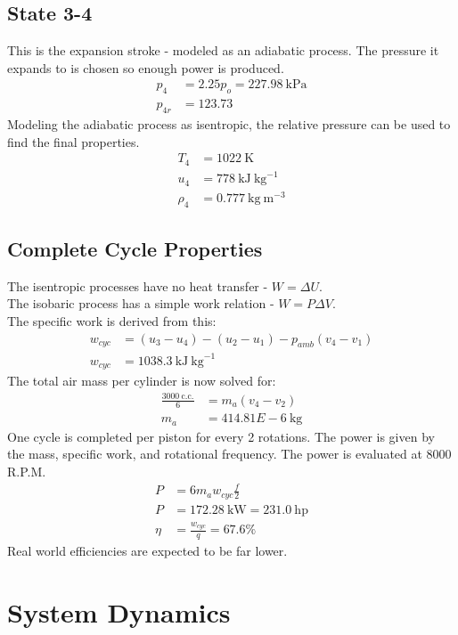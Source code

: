 \documentclass[10pt,a4paper]{article}
\begin{document}
	\subsection*{State 3-4}
	This is the expansion stroke - modeled as an adiabatic process. The pressure it expands to is chosen so enough power is produced.
	\begin{align*}
		p_4 &= 2.25 p_o = 227.98\ \text{kPa}\\
		p_{4r} &= 123.73
	\end{align*}
	Modeling the adiabatic process as isentropic, the relative pressure can be used to find the final properties.
	\begin{align*}
		T_4 &= 1022\ \text{K}\\
		u_4 &= 778\ \text{kJ}\ \text{kg}^{-1}\\
		\rho_4 &= 0.777\ \text{kg}\ \text{m}^{-3}
	\end{align*}
	\subsection*{Complete Cycle Properties}
	The isentropic processes have no heat transfer - $W = \Delta U$.\\
	The isobaric process has a simple work relation - $W = P \Delta V$.\\
	The specific work is derived from this:
	\begin{align*}
		w_{cyc} &= (u_3-u_4) - (u_2-u_1) - p_{amb}(v_4 - v_1) \\
		w_{cyc} &= 1038.3\ \text{kJ}\ \text{kg}^{-1}
	\end{align*}
	The total air mass per cylinder is now solved for:
	\begin{align*}
		\frac{3000\ \text{c.c.}}{6} &= m_a(v_4-v_2)\\
		m_a &= 414.81E-6\ \text{kg}
	\end{align*}
	One cycle is completed per piston for every 2 rotations. The power is given by the mass, specific work, and rotational frequency. The power is evaluated at 8000 R.P.M.
	\begin{align*}
		P &= 6 m_a w_{cyc} \frac{f}{2}\\
		P &= 172.28\ \text{kW}= 231.0\ \text{hp}\\
		\eta &= \frac{w_{cyc}}{q}= 67.6 \%
	\end{align*}
	Real world efficiencies are expected to be far lower.
	\newpage
	
	\section*{System Dynamics}
	
\end{document}
